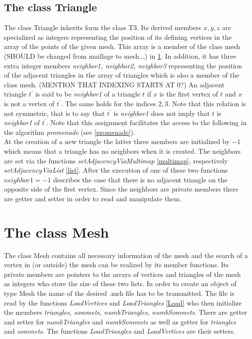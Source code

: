 \documentclass[10pt]{article}
\begin{document}
\subsection{The class Triangle} \label{triangle}
The class Triangle inherits form the class T3. Its derived members $ x,y,z $ are specialized as integers representing the position of its defining vertices in the array of the points of the given mesh. This array is a member of the class mesh (SHOULD be changed from maillage to mesh...) in \ref{mesh}. In addition, it has three extra integer members {\itshape neighbor1, neighbor2, neighbor3} representing the position of the adjacent triangles in the array of triangles which is also a member of the class mesh. (MENTION THAT INDEXING STARTS AT 0?) An adjacent triangle $ t^{'} $ is said to be  {\itshape neighbor1 } of a triangle $ t $ if $ x $ is the first vertex of $t$ and $x$ is not a vertex of $ t^{'} $. The same holds for the indices $ 2,3 $. Note that this relation is not symmetric, that is to say that $ t^{'} $ is {\itshape neighbor1} does not imply that $t$ is {\itshape neighbor1} of $t^{'}$. 
Note that this assignment facilitates the access to the following in the algorithm {\itshape promenade} (see \ref{promenade}).  \\
At the creation of a new triangle the latter three members are initialized by $ -1 $ which means that a triangle has no neighbors when it is created. The neighbors are set via the functions {\itshape setAdjacencyViaMultimap} \ref{multimap}, respectively {\itshape setAdjacencyViaList} \ref{list}. After the execution of one of these two functions $neighbor1 =  -1 $ describes the case that there is no adjacent triangle on the opposite side of the first vertex. 
Since the neighbors are private members there are getter and setter in order to read and manipulate them. \\



\section{The class Mesh} \label{mesh}
The class Mesh contains all necessary information of the mesh and the search of a vertex in (or outside) the mesh can be realized by its member functions. Its private members are pointers to the arrays of vertices and triangles of the mesh as integers who store the size of these two lists.
In order to create an object of type Mesh the name of the desired .msh file has to be transmitted. The file is read by the functions {\itshape LoadVertices} and {\itshape LoadTriangles} \ref{Load} who then initialize the members {\itshape triangles, sommets, numbTriangles, numbSommets}. 
There are getter and setter for {\itshape numbTriangles} and {\itshape numbSommets} as well as getter for {\itshape triangles} and {\itshape sommets}. The functions {\itshape LoadTriangles} and {\itshape LoadVertices} are their setters. \\
\end{document}
